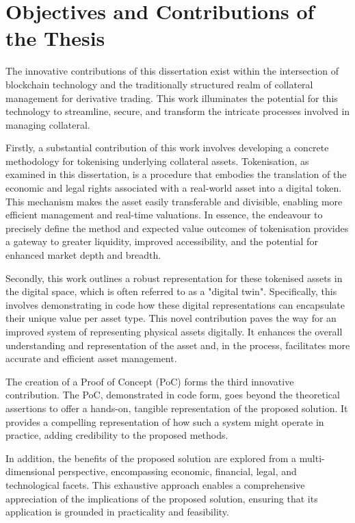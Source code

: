 \section{Objectives and Contributions of the Thesis}
\label{sec:objectives}

The innovative contributions of this dissertation exist within the intersection of blockchain technology and the traditionally structured realm of collateral management for derivative trading. This work illuminates the potential for this technology to streamline, secure, and transform the intricate processes involved in managing collateral.

Firstly, a substantial contribution of this work involves developing a concrete methodology for tokenising underlying collateral assets. Tokenisation, as examined in this dissertation, is a procedure that embodies the translation of the economic and legal rights associated with a real-world asset into a digital token. This mechanism makes the asset easily transferable and divisible, enabling more efficient management and real-time valuations. In essence, the endeavour to precisely define the method and expected value outcomes of tokenisation provides a gateway to greater liquidity, improved accessibility, and the potential for enhanced market depth and breadth.

Secondly, this work outlines a robust representation for these tokenised assets in the digital space, which is often referred to as a "digital twin". Specifically, this involves demonstrating in code how these digital representations can encapsulate their unique value per asset type. This novel contribution paves the way for an improved system of representing physical assets digitally. It enhances the overall understanding and representation of the asset and, in the process, facilitates more accurate and efficient asset management.

The creation of a Proof of Concept (PoC) forms the third innovative contribution. The PoC, demonstrated in code form, goes beyond the theoretical assertions to offer a hands-on, tangible representation of the proposed solution. It provides a compelling representation of how such a system might operate in practice, adding credibility to the proposed methods.

In addition, the benefits of the proposed solution are explored from a multi-dimensional perspective, encompassing economic, financial, legal, and technological facets. This exhaustive approach enables a comprehensive appreciation of the implications of the proposed solution, ensuring that its application is grounded in practicality and feasibility.

